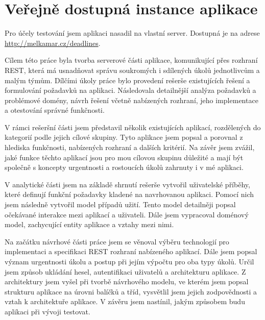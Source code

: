 \documentclass[thesis=B,czech]{FITthesis}[2012/06/26]
\begin{document}
	\section{Veřejně dostupná instance aplikace}
		Pro účely testování jsem aplikaci nasadil na vlastní server. Dostupná je na adrese \url{http://melkamar.cz/deadlines}.
	



\begin{conclusion}
	Cílem této práce byla tvorba serverové části aplikace, komunikující přes rozhraní REST, která má usnadňovat správu soukromých i sdílených úkolů jednotlivcům a malým týmům. Dílčími úkoly práce bylo provedení rešerše existujících řešení a formulování požadavků na aplikaci. Následovala detailnější analýza požadavků a problémové domény, návrh řešení včetně nabízených rozhraní, jeho implementace a otestování správné funkčnosti.
	
	
	V rámci rešeršní části jsem představil několik existujících aplikací, rozdělených do kategorií podle jejich cílové skupiny. Tyto aplikace jsem popsal a porovnal z hlediska funkčnosti, nabízených rozhraní a dalších kritérií. Na závěr jsem zvážil, jaké funkce těchto aplikací jsou pro mou cílovou skupinu důležité a mají být společně s koncepty urgentnosti a rostoucích úkolů zahrnuty i v mé aplikaci. 
	
	V analytické části jsem na základě shrnutí rešerše vytvořil uživatelské příběhy, které definují funkční požadavky kladené na navrhovanou aplikaci. Pomocí nich jsem následně vytvořil model případů užití. Tento model detailněji popsal očekávané interakce mezi aplikací a uživateli. Dále jsem vypracoval doménový model, zachycující entity aplikace a vztahy mezi nimi.
	
	Na začátku návrhové části práce jsem se věnoval výběru technologií pro implementaci a specifikaci REST rozhraní nabízeného aplikací. Dále jsem popsal význam urgentnosti úkolu a postup při jejím výpočtu pro oba typy úkolů. Určil jsem způsob ukládání hesel, autentifikaci uživatelů a architekturu aplikace. Z architektury jsem vyšel při tvorbě návrhového modelu, ve kterém jsem popsal strukturu aplikace na úrovni balíčků a tříd, vysvětlil jsem jejich zodpovědnosti a vztah k architektuře aplikace. V závěru jsem nastínil, jakým způsobem budu aplikaci při vývoji testovat.
	

\end{conclusion}
\end{document}
